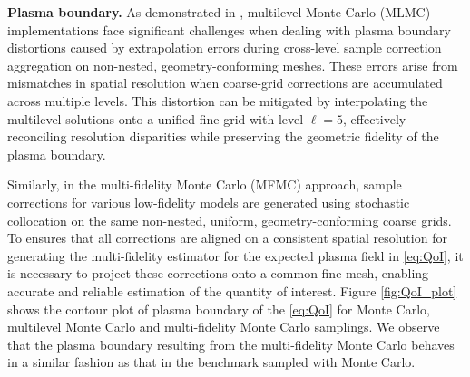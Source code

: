 \noindent \textbf{Plasma boundary.} 
As demonstrated in \cite{ElLiSa:2023}, multilevel Monte Carlo (MLMC) implementations face significant challenges when dealing with plasma boundary distortions caused by extrapolation errors during cross-level sample correction aggregation on non-nested, geometry-conforming meshes. These errors arise from mismatches in spatial resolution when coarse-grid corrections are accumulated across multiple levels. This distortion can be mitigated by interpolating the multilevel solutions onto a unified fine grid with level $\ell=5$, effectively reconciling resolution disparities while preserving the geometric fidelity of the plasma boundary.





Similarly, in the multi-fidelity Monte Carlo (MFMC) approach, sample corrections for various low-fidelity models are generated using stochastic collocation on the same non-nested, uniform, geometry-conforming coarse grids. To ensures that all corrections are aligned on a consistent spatial resolution for generating the multi-fidelity estimator for the expected plasma field in \eqref{eq:QoI}, it is necessary to project these corrections onto a common fine mesh, enabling accurate and reliable estimation of the quantity of interest. Figure \ref{fig:QoI_plot} shows the contour plot of plasma boundary of the \eqref{eq:QoI} for Monte Carlo, multilevel Monte Carlo and multi-fidelity Monte Carlo samplings. We observe that the plasma boundary resulting from the multi-fidelity Monte Carlo behaves in a similar fashion as that in the benchmark sampled with Monte Carlo.








